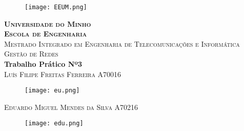 \documentclass[../momento_1.tex]{subfiles}
\begin{document}
\begin{titlepage}

\center %
 
\begin{figure}[h]
\centering
\texttt{[image: EEUM.png]} %
\end{figure}

\textsc{\Large \textbf{Universidade do Minho}}\\
\textsc{\large \textbf{Escola de Engenharia}}\\[2cm] %
\textsc{\small Mestrado Integrado em Engenharia de Telecomunicações e Informática}\\[0.5cm] %
\textsc{\normalsize Gestão de Redes}\\[2cm] %


{\huge \bfseries Trabalho Prático Nº3} \\[2cm] %


\textsc{Luís Filipe Freitas Ferreira A70016}\par
\begin{figure}[h]
\centering
\texttt{[image: eu.png]} %
\end{figure}
\textsc{Eduardo Miguel Mendes da Silva A70216}\par
\begin{figure}[h]
\centering
\texttt{[image: edu.png]} %
\end{figure}


\end{titlepage}
\end{document}

